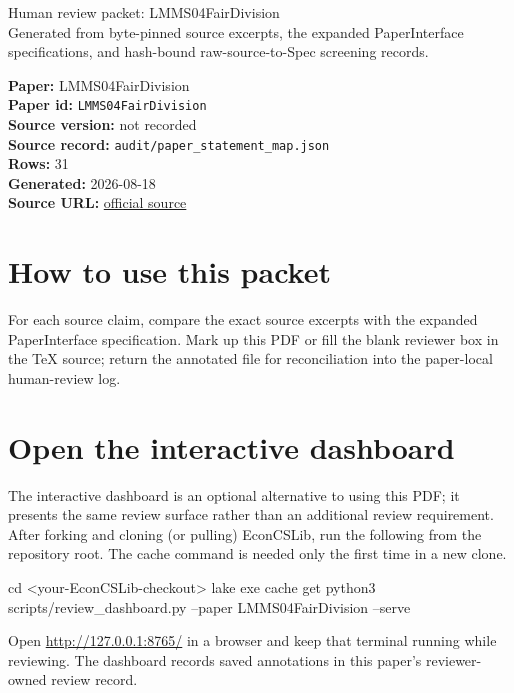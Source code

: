 \documentclass[10pt]{article}
\begin{document}
\fontsize{9}{10}\selectfont

\begin{center}
{\LARGE Human review packet: LMMS04FairDivision}\\[0.35em]
\small Generated from byte-pinned source excerpts, the expanded PaperInterface
specifications, and hash-bound raw-source-to-Spec screening records.
\end{center}

\noindent\textbf{Paper:} LMMS04FairDivision\\
\textbf{Paper id:} \texttt{LMMS04FairDivision}\\
\textbf{Source version:} not recorded\\
\textbf{Source record:} \texttt{audit/paper\_statement\_map.json}\\
\textbf{Rows:} 31\\
\textbf{Generated:} 2026-08-18\\
\textbf{Source URL:} \href{https://www.stat.berkeley.edu/~mossel/publications/happy.pdf}{official source}

\noindent{}\par



\section*{How to use this packet}
For each source claim, compare the exact source excerpts with the expanded
PaperInterface specification. Mark up this PDF or fill the blank reviewer box in the TeX source;
return the annotated file for reconciliation into the paper-local human-review
log.

\section*{Open the interactive dashboard}
The interactive dashboard is an optional alternative to using this PDF; it
presents the same review surface rather than an additional review requirement.
After forking and cloning (or pulling) EconCSLib, run the following from the
repository root. The cache command is needed only the first time in a new clone.
\begin{ReviewVerbatim}
cd <your-EconCSLib-checkout>
lake exe cache get
python3 scripts/review_dashboard.py --paper LMMS04FairDivision --serve
\end{ReviewVerbatim}
Open \url{http://127.0.0.1:8765/} in a browser and keep that terminal running
while reviewing. The dashboard records saved annotations in this paper's
reviewer-owned review record.
\end{document}

